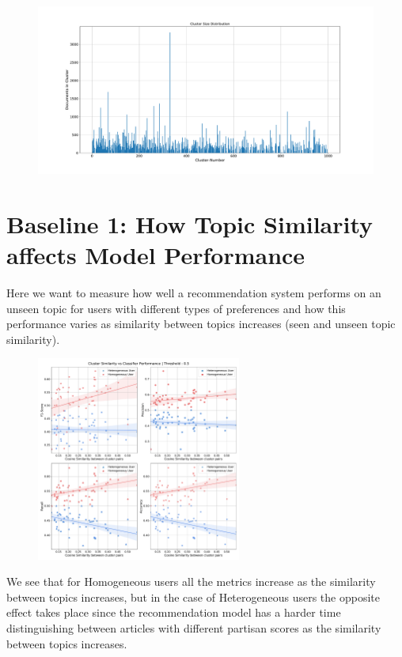 \documentclass[a4paper,fontsize=9.0pt]{scrartcl}
\begin{document}
\begin{flushleft}
\begin{itemize}
\end{itemize}
\begin{figure}[H]
 \centering
 \includegraphics[scale=0.34]{Graphs/cluster_size_dist.pdf}
\end{figure}
\end{flushleft}


\vspace{15ex}
\section{Baseline 1: How Topic Similarity affects Model Performance}
\begin{flushleft}
Here we want to measure how well a recommendation system performs on an unseen topic for users with different types of preferences and how this performance varies as similarity between topics increases (seen and unseen topic similarity).
\end{flushleft}
\vspace{-5ex}
\begin{figure}[H]
 \includegraphics[width=0.6\textwidth]{Graphs/cluster_sim_vs_model_perf_5.pdf}
\end{figure}
\begin{flushleft}
We see that for Homogeneous users all the metrics increase as the similarity between topics increases, but in the case of Heterogeneous users the opposite effect takes place since the recommendation model has a harder time distinguishing between articles with different partisan scores as the similarity between topics increases.
\end{flushleft}
\end{document}
